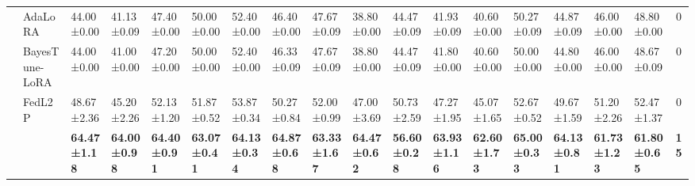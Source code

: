 \begin{table*}[]
\begin{scriptsize}
{\begin{tabular}{c|l|l|l|l|l|l|l|l|l|l|l|l|l|l|l|l|c}
                    & AdaLoRA                              & 44.00±0.00                        & 41.13±0.09                       & 47.40±0.00                        & 50.00±0.00                        & 52.40±0.00                        & 46.40±0.00                        & 47.67±0.09                       & 38.80±0.00                        & 44.47±0.09                       & 41.93±0.09                       & 40.60±0.00                        & 50.27±0.09                       & 44.87±0.09                       & 46.00±0.00                        & 48.80±0.00                        & 0             \\ %
                    & BayesTune-LoRA                            & 44.00±0.00                        & 41.00±0.00                        & 47.20±0.00                        & 50.00±0.00                        & 52.40±0.00                        & 46.33±0.09                       & 47.67±0.09                       & 38.80±0.00                        & 44.47±0.09                       & 41.80±0.00                        & 40.60±0.00                        & 50.00±0.00                        & 44.80±0.00                        & 46.00±0.00                        & 48.67±0.09                       & 0             \\ %
                    & FedL2P                               & 48.67±2.36                       & 45.20±2.26                        & 52.13±1.20                        & 51.87±0.52                       & 53.87±0.34                       & 50.27±0.84                       & 52.00±0.99                        & 47.00±3.69                        & 50.73±2.59                       & 47.27±1.95                       & 45.07±1.65                       & 52.67±0.52                       & 49.67±1.59                       & 51.20±2.26                        & 52.47±1.37                       & 0             \\ %
                    & \method{}                                 & \textbf{64.47±1.18}              & \textbf{64.00±0.98}               & \textbf{64.40±0.91}               & \textbf{63.07±0.41}              & \textbf{64.13±0.34}              & \textbf{64.87±0.68}              & \textbf{63.33±1.67}              & \textbf{64.47±0.62}              & \textbf{56.60±0.28}               & \textbf{63.93±1.16}              & \textbf{62.60±1.73}               & \textbf{65.00±0.33}               & \textbf{64.13±0.81}              & \textbf{61.73±1.23}              & \textbf{61.80±0.65}               & \textbf{15}   \\ \hline

\end{tabular}}
\end{scriptsize}
\end{table*}
